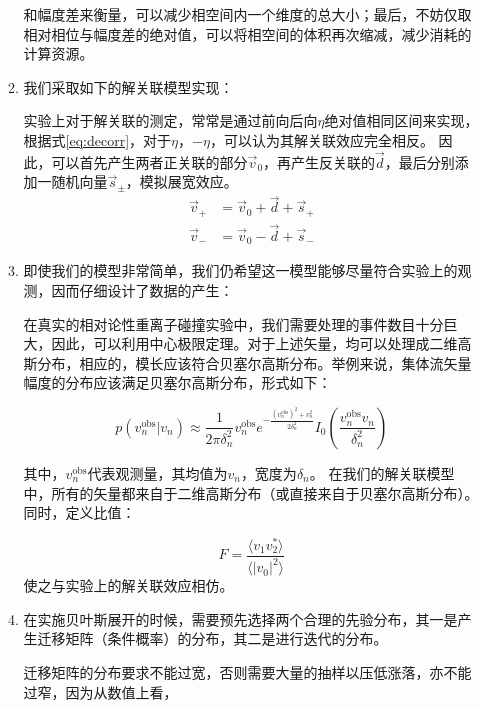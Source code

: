 \documentclass[aps,pre,12pt,preprint,onecolumn,showpacs,showkeys]{revtex4-1}
\begin{document}
\begin{enumerate}
\begin{enumerate}
        和幅度差来衡量，可以减少相空间内一个维度的总大小；最后，不妨仅取相对相位与幅度差的绝对值，可以将相空间的体积再次缩减，减少消耗的计算资源。
        \item 我们采取如下的解关联模型实现：\par
        实验上对于解关联的测定，常常是通过前向后向$\eta$绝对值相同区间来实现，根据式\ref{eq:decorr}，对于$\eta$，$-\eta$，可以认为其解关联效应完全相反。
        因此，可以首先产生两者正关联的部分$\vec{v}_0$，再产生反关联的$\vec{d}$，最后分别添加一随机向量$\vec{s}_\pm$，模拟展宽效应。
        \begin{equation}
            \begin{aligned}
                \vec{v}_+&=\vec{v}_0+\vec{d}+\vec{s}_+\\
                \vec{v}_-&=\vec{v}_0-\vec{d}+\vec{s}_-
            \end{aligned}
        \end{equation}
        \item 即使我们的模型非常简单，我们仍希望这一模型能够尽量符合实验上的观测，因而仔细设计了数据的产生：\par
        在真实的相对论性重离子碰撞实验中，我们需要处理的事件数目十分巨大，因此，可以利用中心极限定理。对于上述矢量，均可以处理成二维高斯分布，相应的，模长应该符合贝塞尔高斯分布。举例来说，集体流矢量幅度的分布应该满足贝塞尔高斯分布，形式如下：\par
        \begin{equation}
            p\left(v_{n}^{\mathrm{obs}} | v_{n}\right) \approx \frac{1}{2 \pi \delta_{n}^{2}} v_{n}^{\mathrm{obs}} e^{-\frac{\left(v_{n}^{\mathrm{obs}}\right)^{2}+v_{n}^{2}}{2 \delta_{n}^{2}}} I_{0}\left(\frac{v_{n}^{\mathrm{obs}} v_{n}}{\delta_{n}^{2}}\right)
        \end{equation}
        \par
        其中，$v_{n}^{\mathrm{obs}}$代表观测量，其均值为$v_n$，宽度为$\delta_n$。
        在我们的解关联模型中，所有的矢量都来自于二维高斯分布（或直接来自于贝塞尔高斯分布）。同时，定义比值：\par
        \begin{equation}
            F=\frac{\langle v_1v_2^*\rangle}{\langle|v_0|^2\rangle}
        \end{equation}
        使之与实验上的解关联效应相仿。
        \item 在实施贝叶斯展开的时候，需要预先选择两个合理的先验分布，其一是产生迁移矩阵（条件概率）的分布，其二是进行迭代的分布。\par
        迁移矩阵的分布要求不能过宽，否则需要大量的抽样以压低涨落，亦不能过窄，因为从数值上看，

\end{enumerate}
\end{enumerate}
\end{document}
